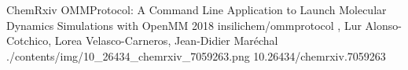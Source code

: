 \begin{cventries}

  \pubentry
    {ChemRxiv} %
    {OMMProtocol: A Command Line Application to Launch Molecular Dynamics Simulations with OpenMM} %
    {2018} %
    {insilichem/ommprotocol} %
    {,\textsuperscript{\dagger} Lur Alonso-Cotchico, Lorea Velasco-Carneros, Jean-Didier Maréchal\textsuperscript{\dagger}} %
    {./contents/img/10_26434_chemrxiv_7059263.png} %
    {10.26434/chemrxiv.7059263} %

\end{cventries}
